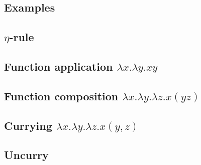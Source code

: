 \documentclass{article}
\theoremstyle{definition}
\begin{document}










\newpage
 


\newpage
\begin{appendices}
		
    \begin{landscape}
    	\section{Examples}
        \subsection{\texorpdfstring{$\eta$}{}-rule}  \label{ex3}
        \subsection{Function application \texorpdfstring{$\lambda x . \lambda y . x y$}{}}  \label{ex2}
        \newpage\subsection{Function composition \texorpdfstring{$\lambda x . \lambda y . \lambda z . x ( y z)$}{}}  \label{ex7}        
        \newpage\subsection{Currying \texorpdfstring{$\lambda x . \lambda y . \lambda z . x (y, z)$}{}}  \label{ex8}
        \newpage\subsection{Uncurry}  \label{ex9}
        
    \end{landscape}
\end{appendices}
\end{document}
